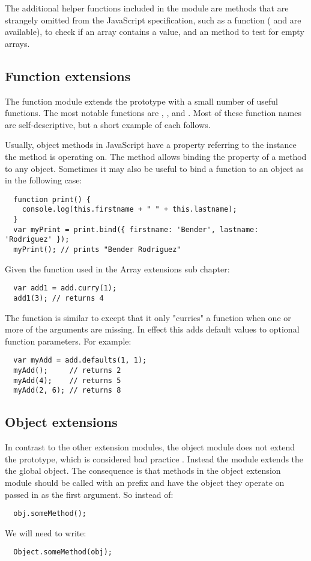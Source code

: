 The additional helper functions included in the module are methods that are strangely omitted from the JavaScript specification, such as a  function ( and  are available),  to check if an array contains a value, and an  method to test for empty arrays.

\subsection{Function extensions}
The function module extends the  prototype with a small number of useful functions. The most notable functions are , , and . Most of these function names are self-descriptive, but a short example of each follows.

Usually, object methods in JavaScript have a  property referring to the instance the method is operating on. The  method allows binding the  property of a method to any object. Sometimes it may also be useful to bind a function to an object as in the following case:
\begin{verbatim}
  function print() {
    console.log(this.firstname + " " + this.lastname);
  }
  var myPrint = print.bind({ firstname: 'Bender', lastname: 'Rodriguez' });
  myPrint(); // prints "Bender Rodriguez"
\end{verbatim}
Given the  function used in the Array extensions sub chapter:
\begin{verbatim}
  var add1 = add.curry(1);
  add1(3); // returns 4
\end{verbatim}
The  function is similar to  except that it only "curries" a function when one or more of the arguments are missing. In effect this adds default values to optional function parameters. For example:
\begin{verbatim}
  var myAdd = add.defaults(1, 1);
  myAdd();     // returns 2
  myAdd(4);    // returns 5
  myAdd(2, 6); // returns 8
\end{verbatim}

\subsection{Object extensions}
In contrast to the other extension modules, the object module does not extend the  prototype, which is considered bad practice \cite{arvidsson05}. Instead the module extends the the global  object. The consequence is that methods in the object extension module should be called with an  prefix and have the object they operate on passed in as the first argument. So instead of:
\begin{verbatim}
  obj.someMethod();
\end{verbatim}
We will need to write:
\begin{verbatim}
  Object.someMethod(obj);
\end{verbatim}

